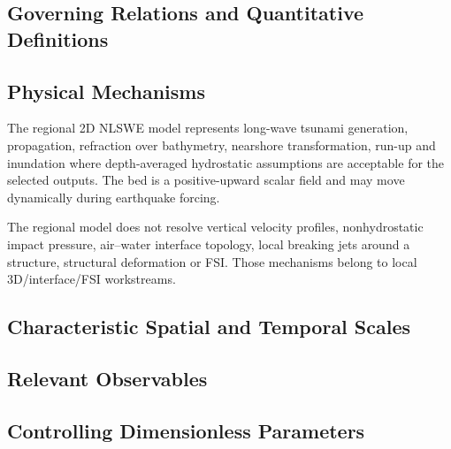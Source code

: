\subsection{Governing Relations and Quantitative Definitions}
\label{sec:res-phy-syn-governing-relations}

%

\subsection{Physical Mechanisms}
\label{sec:res-phy-syn-physical-mechanisms}

The regional 2D NLSWE model represents long-wave tsunami generation,
propagation, refraction over bathymetry, nearshore transformation,
run-up and inundation where depth-averaged hydrostatic assumptions are
acceptable for the selected outputs. The bed is a positive-upward scalar
field and may move dynamically during earthquake forcing.

The regional model does not resolve vertical velocity profiles,
nonhydrostatic impact pressure, air--water interface topology, local
breaking jets around a structure, structural deformation or FSI. Those
mechanisms belong to local 3D/interface/FSI workstreams.

\subsection{Characteristic Spatial and Temporal Scales}
\label{sec:res-phy-syn-characteristic-spatial-temporal-scales}


\subsection{Relevant Observables}
\label{sec:res-phy-syn-relevant-observables}


\subsection{Controlling Dimensionless Parameters}
\label{sec:res-phy-syn-controlling-dimensionless-parameters}

